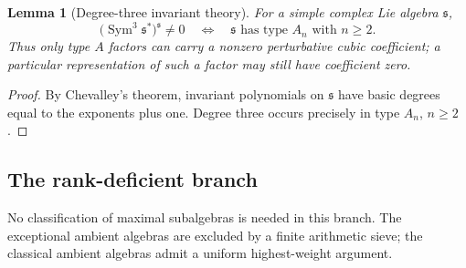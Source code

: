 \documentclass[11pt]{article}
\newtheorem{lemma}[theorem]{Lemma}
\theoremstyle{remark}
\begin{document}
\begin{lemma}[Degree-three invariant theory]
\label{lem:degree-three-invariant}
For a simple complex Lie algebra \(\mathfrak s\),
\[
 \bigl(\operatorname{Sym}^3\mathfrak s^*\bigr)^{\mathfrak s}\ne0
 \quad\Longleftrightarrow\quad
 \mathfrak s\text{ has type }A_n\text{ with }n\ge2.
\]
Thus only type \(A\) factors can carry a nonzero perturbative cubic
coefficient; a particular representation of such a factor may still have
coefficient zero.
\end{lemma}
\begin{proof}
By Chevalley's theorem, invariant polynomials on \(\mathfrak s\) have basic
degrees equal to the exponents plus one.  Degree three occurs precisely in
type \(A_n\), \(n\ge2\).
\end{proof}

\subsection{The rank-deficient branch}

No classification of maximal subalgebras is needed in this branch.  The
exceptional ambient algebras are excluded by a finite arithmetic sieve; the
classical ambient algebras admit a uniform highest-weight argument.
\end{document}
